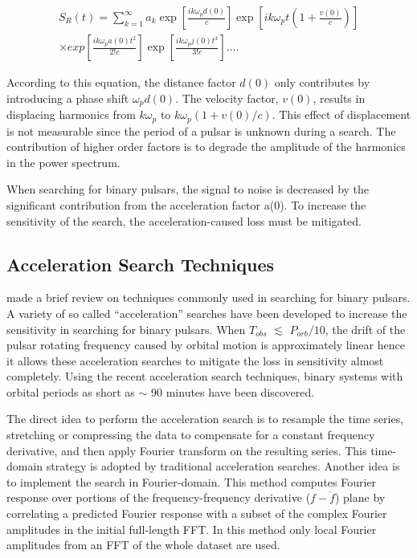 \documentclass[preprint2]{aastex}
\begin{document}
\begin{eqnarray}
\nonumber S_R(t)=\sum_{k=1}^{\infty}a_k \exp[\frac{ik\omega_pd(0)}{c}]\exp[ik\omega_pt(1+\frac{v(0)}{c})]\\
\times exp[\frac{ik\omega_pa(0)t^2}{2! c}]\exp[\frac{ik\omega_pj(0)t^3}{3! c}]\ldots.
\end{eqnarray}

According to this equation, the distance factor $d(0)$ only contributes by  introducing a phase shift $\omega_pd(0)$.
The velocity factor, $v(0)$, results in 
displacing harmonics from $k\omega_p$ to $k\omega_p(1+v(0)/c)$. This effect of displacement is not measurable 
since the period of a pulsar is unknown during a search.
The contribution of higher order factors is to degrade the amplitude of the harmonics 
in the power spectrum. 

When searching for binary pulsars, the signal to noise is decreased by the significant contribution from the 
acceleration factor a(0). To increase the sensitivity of the search, the acceleration-caused loss must be mitigated.


\subsection{Acceleration Search Techniques}
\citet{eat09} made a brief review on techniques commonly used in searching for binary pulsars.
A variety of so called ``acceleration'' searches have been developed to increase 
the sensitivity in searching for binary pulsars. When $T_{obs}$ $\lesssim$ 
$P_{orb}/10$, the drift of the pulsar rotating frequency caused by orbital motion 
is approximately linear hence it allows these acceleration searches to mitigate the 
loss in sensitivity almost completely. Using the recent acceleration search techniques,
binary systems with orbital periods as short as $\sim$ 90 
minutes have been discovered\citep{ran03}.
 
The direct idea to perform the acceleration search is to resample the time series, 
stretching or compressing the data to compensate for a constant frequency derivative, 
and then apply Fourier transform on the resulting series. This time-domain strategy 
is adopted by traditional acceleration searches. Another idea is to implement the
search in Fourier-domain. This method computes Fourier 
response over portions of the frequency-frequency derivative ($f-\dot{f}$) plane by
correlating a predicted Fourier response with a subset of the complex 
Fourier amplitudes in the initial full-length FFT. In this method only local Fourier amplitudes 
from an FFT of the whole dataset are used. 
\end{document}
